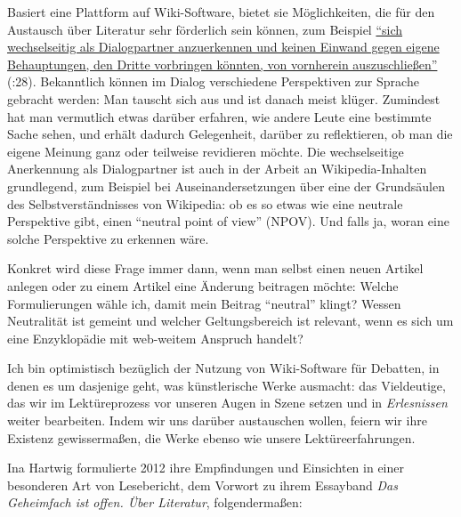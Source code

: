 \documentclass[fontsize=12pt]{scrartcl}
\begin{document}
Basiert eine Plattform auf Wiki-Software, bietet sie M\"oglichkei\-ten, die f\"ur den Austausch \"uber Li\-te\-ra\-tur sehr f\"orderlich sein k\"onnen, zum Beispiel \href{http://edocs.fu-berlin.de/docs/receive/FUDOCS_document_000000010457}{"`sich wechsel\-sei\-tig als Dialogpartner anzuerkennen und keinen Einwand gegen eigene Behauptungen, den Dritte vorbringen k\"onnten, von vornherein auszuschlie{\ss}en"'} (\cite{Schmidt2010}:28). Bekanntlich k\"onnen im Dialog verschiedene Perspektiven zur Sprache gebracht werden: Man tauscht sich aus und ist danach meist kl\"uger. Zumindest hat man vermutlich etwas dar\"uber erfahren, wie andere Leute eine bestimmte Sache sehen, und erh\"alt dadurch Gelegenheit, dar\"uber zu reflektieren, ob man die eigene Meinung ganz oder teilweise revidieren m\"ochte. Die wech\-sel\-sei\-tige Anerkennung als Dialogpartner\textsuperscript{\tiny *} ist auch in der Arbeit an Wi\-ki\-pe\-dia-Inhalten grundlegend, zum Beispiel bei Auseinandersetzungen \"uber eine der Grunds\"aulen des Selbstverst\"andnisses von Wi\-ki\-pe\-dia: ob es so etwas wie eine neutrale Perspektive gibt, einen "`neutral point of view"' (NPOV). Und falls ja, woran eine solche Perspektive zu erkennen w\"are. 

Konkret wird diese Frage immer dann, wenn man \mbox{selbst} einen neuen Artikel anlegen oder zu einem Artikel eine \"Anderung beitragen m\"ochte: Welche Formulierungen w\"ahle ich, damit mein Beitrag "`neutral"' klingt? Wessen Neutralit\"at ist gemeint und welcher Geltungsbereich ist relevant, wenn es sich um eine Enzyklop\"adie mit web-weitem Anspruch handelt?

Ich bin optimistisch bez\"uglich der Nutzung von Wiki-Software f\"ur Debatten, in denen es um dasjenige geht, was k\"unstlerische Werke ausmacht: das Vieldeutige, das wir im Lek\-t\"u\-re\-pro\-zess vor unseren Augen in Szene setzen und in \textit{Erlesnissen} wei\-ter bearbei\-ten. Indem wir uns dar\"uber austauschen wollen, feiern wir ihre Existenz gewisserma{\ss}en, die Werke ebenso wie unsere Lekt\"ureerfah\-rungen. 

Ina Hartwig formulierte 2012 ihre Empfindungen und Einsichten in einer besonderen Art von Lesebericht, dem Vorwort zu ihrem Essayband \textit{Das Geheimfach ist offen. \"Uber Li\-te\-ra\-tur}, folgenderma{\ss}en:
\end{document}

